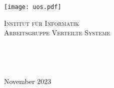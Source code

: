 \makeatletter
\begin{titlepage}
    \centering
    \thispagestyle{empty}
    \begin{center}
        \texttt{[image: uos.pdf]}
    \end{center}
    \LARGE{\textsc{Institut für Informatik\\Arbeitsgruppe Verteilte Systeme}}
    \vfill
    \LARGE{\emph{\SeminarTitle}}\\
    \vspace{8mm}
    \huge{\textbf{{\selectfont
                    \PaperTitle}}}\\
    \vspace{9mm}
    \LARGE{\Author}\\
    \vspace{0.2cm}
    \normalsize{\MatrNr}\\
    \vspace{4cm}
    \large{\SeminarTerm}\\
    \vspace{0.2cm}
    \large{November 2023}\\
    \vfill
\end{titlepage}
\makeatother